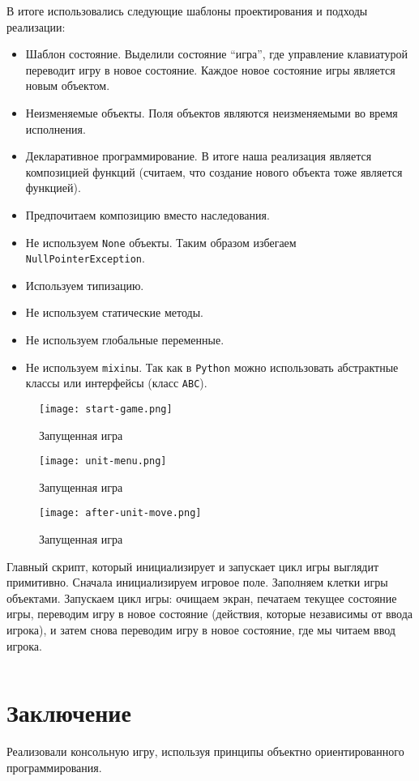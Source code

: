 В итоге использовались следующие шаблоны проектирования и подходы реализации:

\begin{itemize}
	\item Шаблон состояние. Выделили состояние ``игра'', где управление клавиатурой
	      переводит игру в новое состояние. Каждое новое состояние игры является новым
	      объектом.
	\item Неизменяемые объекты.
	      Поля объектов являются неизменяемыми во время исполнения.
	\item Декларативное программирование.
	      В итоге наша реализация является композицией функций
	      (считаем, что создание нового объекта тоже является функцией).
	\item Предпочитаем композицию вместо наследования.
	\item Не используем \verb|None| объекты.
	      Таким образом избегаем \verb|NullPointerException|.
	\item Используем типизацию.
	\item Не используем статические методы.
	\item Не используем глобальные переменные.
	\item Не используем \verb|mixin|ы.
	      Так как в \verb|Python| можно использовать абстрактные классы или интерфейсы
	      (класс \verb|ABC|).
\end{itemize}

\begin{figure}[H]
	\begin{center}
		\texttt{[image: start-game.png]}
		\caption{Запущенная игра}
	\end{center}
\end{figure}

\begin{figure}[H]
	\begin{center}
		\texttt{[image: unit-menu.png]}
		\caption{Запущенная игра}
	\end{center}
\end{figure}

\begin{figure}[H]
	\begin{center}
		\texttt{[image: after-unit-move.png]}
		\caption{Запущенная игра}
	\end{center}
\end{figure}

Главный скрипт, который инициализирует и запускает цикл игры выглядит примитивно.
Сначала инициализируем игровое поле. Заполняем клетки игры объектами.
Запускаем цикл игры: очищаем экран, печатаем текущее состояние игры,
переводим игру в новое состояние (действия, которые независимы от ввода игрока),
и затем снова переводим игру в новое состояние, где мы читаем ввод игрока.

\begin{code}
	\inputminted[linenos]{python}{../src/main.py}
	\caption{main.py --- главный скрипт игры}
\end{code}

\section*{Заключение}
Реализовали консольную игру, используя принципы объектно ориентированного программирования.
